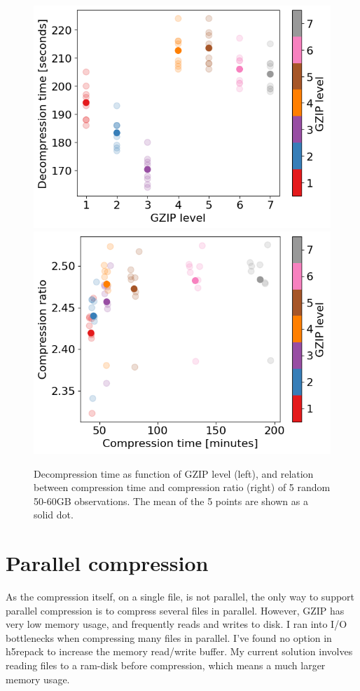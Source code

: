 \documentclass[10pt, a4paper]{article}
\begin{document}
\begin{figure}[H]
    \centering
    \includegraphics[scale=0.55]{plots/gzip_decomptime.png}
    \includegraphics[scale=0.55]{plots/comptime_compratio.png}
    \caption{Decompression time as function of GZIP level (left), and relation between compression time and compression ratio (right) of 5 random 50-60GB observations. The mean of the 5 points are shown as a solid dot.}
    \label{}
\end{figure}


\section*{Parallel compression}
As the compression itself, on a single file, is not parallel, the only way to support parallel compression is to compress several files in parallel. However, GZIP has very low memory usage, and frequently reads and writes to disk. I ran into I/O bottlenecks when compressing many files in parallel. I've found no option in h5repack to increase the memory read/write buffer. My current solution involves reading files to a ram-disk before compression, which means a much larger memory usage.
\end{document}
